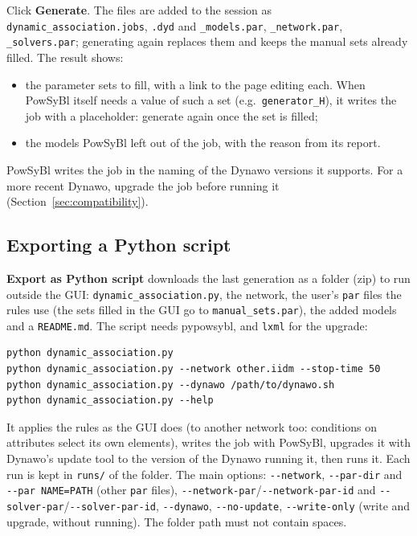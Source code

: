 \documentclass[a4paper,11pt]{article}
\newcommand{\code}[1]{\texttt{\small #1}}
\newcommand{\ftype}[1]{\texttt{\small\color{rteblu}#1}}
\begin{document}
Click \textbf{Generate}. The files are added to the session as
\code{dynamic\_association.jobs}, \code{.dyd} and \code{\_models.par},
\code{\_network.par}, \code{\_solvers.par}; generating again replaces them and
keeps the manual sets already filled. The result shows:

\begin{itemize}[leftmargin=2em]
  \item the parameter sets to fill, with a link to the page editing each.
    When PowSyBl itself needs a value of such a set (e.g.\
    \code{generator\_H}), it writes the job with a placeholder: generate again
    once the set is filled;
  \item the models PowSyBl left out of the job, with the reason from its
    report.
\end{itemize}

\begin{notebox}
PowSyBl writes the job in the naming of the Dynawo versions it supports. For a
more recent Dynawo, upgrade the job before running it
(Section~\ref{sec:compatibility}).
\end{notebox}

\subsection{Exporting a Python script}

\textbf{Export as Python script} downloads the last generation as a folder
(zip) to run outside the GUI: \code{dynamic\_association.py}, the network, the
user's \ftype{par} files the rules use (the sets filled in the GUI go to
\code{manual\_sets.par}), the added models and a \code{README.md}. The script
needs pypowsybl, and \code{lxml} for the upgrade:

\begin{lstlisting}
python dynamic_association.py
python dynamic_association.py --network other.iidm --stop-time 50
python dynamic_association.py --dynawo /path/to/dynawo.sh
python dynamic_association.py --help
\end{lstlisting}

It applies the rules as the GUI does (to another network too: conditions on
attributes select its own elements), writes the job with PowSyBl, upgrades it
with Dynawo's update tool to the version of the Dynawo running it, then runs
it. Each run is kept in \code{runs/} of the folder. The main options:
\code{-{}-network}, \code{-{}-par-dir} and \code{-{}-par NAME=PATH} (other
\ftype{par} files), \code{-{}-network-par}/\code{-{}-network-par-id} and
\code{-{}-solver-par}/\code{-{}-solver-par-id}, \code{-{}-dynawo},
\code{-{}-no-update}, \code{-{}-write-only} (write and upgrade, without running).
The folder path must not contain spaces.
\end{document}
